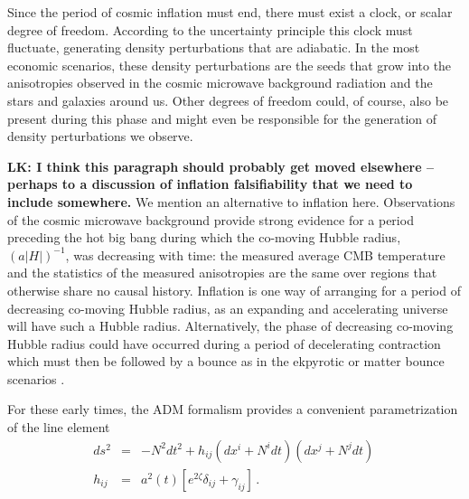 Since the period of cosmic inflation must end, there must exist a clock, or scalar degree of freedom. According to the uncertainty principle this clock must fluctuate, generating density perturbations that are adiabatic. In the most economic scenarios, these density perturbations are the seeds that grow into the anisotropies observed in the cosmic microwave background radiation and the stars and galaxies around us. Other degrees of freedom could, of course, also be present during this phase and might even be responsible for the generation of density perturbations we observe. 


{\bf LK: I think this paragraph should probably get moved elsewhere -- perhaps to a discussion of inflation falsifiability that we need to include somewhere.}
We mention an alternative to inflation here.  Observations of the cosmic microwave background provide strong evidence for a period preceding the hot big bang during which the co-moving Hubble radius, $(a|H|)^{-1}$, was decreasing with time: the measured average CMB temperature and the statistics of the measured anisotropies are the same over regions that otherwise share no causal history. Inflation is one way of arranging for a period of decreasing co-moving Hubble radius, as an expanding and accelerating universe will have such a Hubble radius. Alternatively, the phase of decreasing co-moving Hubble radius could have occurred during a period of decelerating contraction which must then be followed by a bounce as in the ekpyrotic or matter bounce scenarios \cite{Khoury:2001wf,Khoury:2001bz,Steinhardt:2001st,Nayeri:2005ck,Brandenberger:2012zb,Cai:2014jla,deHaro:2015wda}. 

For these early times, the ADM formalism provides a convenient parametrization of the line element
\begin{eqnarray}
\label{eq:metric}
ds^2&=&-N^2dt^2 +h_{ij}(dx^i+N^idt)(dx^j+N^jdt)\,\nonumber\\
h_{ij}&=&a^2(t)[e^{2\zeta}\delta_{ij}+\gamma_{ij}]\,.
\end{eqnarray}

